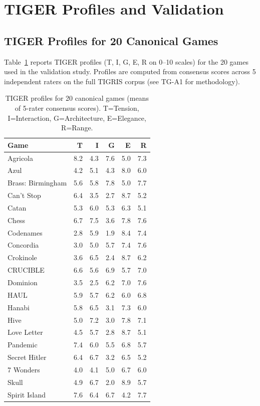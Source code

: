 \section{TIGER Profiles and Validation}
\label{sec:results}

\subsection{TIGER Profiles for 20 Canonical Games}

Table~\ref{tab:profiles} reports TIGER profiles (T, I, G, E, R on 0--10 scales)
for the 20 games used in the validation study. Profiles are computed from
consensus scores across 5 independent raters on the full TIGRIS corpus
(see TG-A1 for methodology).

\begin{table}[ht]
\centering
\caption{TIGER profiles for 20 canonical games (means of 5-rater consensus scores).
T=Tension, I=Interaction, G=Architecture, E=Elegance, R=Range.}
\label{tab:profiles}
\begin{tabular}{lrrrrr}
\toprule
\textbf{Game} & \textbf{T} & \textbf{I} & \textbf{G} & \textbf{E} & \textbf{R} \\
\midrule
Agricola          & 8.2 & 4.3 & 7.6 & 5.0 & 7.3 \\
Azul              & 4.2 & 5.1 & 4.3 & 8.0 & 6.0 \\
Brass: Birmingham & 5.6 & 5.8 & 7.8 & 5.0 & 7.7 \\
Can't Stop        & 6.4 & 3.5 & 2.7 & 8.7 & 5.2 \\
Catan             & 5.3 & 6.0 & 5.3 & 6.3 & 5.1 \\
Chess             & 6.7 & 7.5 & 3.6 & 7.8 & 7.6 \\
Codenames         & 2.8 & 5.9 & 1.9 & 8.4 & 7.4 \\
Concordia         & 3.0 & 5.0 & 5.7 & 7.4 & 7.6 \\
Crokinole         & 3.6 & 6.5 & 2.4 & 8.7 & 6.2 \\
CRUCIBLE          & 6.6 & 5.6 & 6.9 & 5.7 & 7.0 \\
Dominion          & 3.5 & 2.5 & 6.2 & 7.0 & 7.6 \\
HAUL              & 5.9 & 5.7 & 6.2 & 6.0 & 6.8 \\
Hanabi            & 5.8 & 6.5 & 3.1 & 7.3 & 6.0 \\
Hive              & 5.0 & 7.2 & 3.0 & 7.8 & 7.1 \\
Love Letter       & 4.5 & 5.7 & 2.8 & 8.7 & 5.1 \\
Pandemic          & 7.4 & 6.0 & 5.5 & 6.8 & 5.7 \\
Secret Hitler     & 6.4 & 6.7 & 3.2 & 6.5 & 5.2 \\
7 Wonders         & 4.0 & 4.1 & 5.0 & 6.7 & 6.0 \\
Skull             & 4.9 & 6.7 & 2.0 & 8.9 & 5.7 \\
Spirit Island     & 7.6 & 6.4 & 6.7 & 4.2 & 7.7 \\
\bottomrule
\end{tabular}
\end{table}

